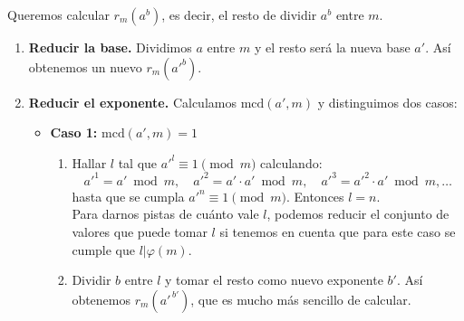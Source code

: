 \documentclass[a4paper,12pt]{article}
\begin{document}
\begin{procedimiento}[title=Reducción de potencias]
Queremos calcular \(r_m(a^b)\), es decir, el resto de dividir \(a^b\) entre \(m\).

\begin{enumerate}
  \item \textbf{Reducir la base.}  
  Dividimos \(a\) entre \(m\) y el resto será la nueva base \(a'\).  
  Así obtenemos un nuevo \(r_m(a'^b)\).

  \item \textbf{Reducir el exponente.}  
  Calculamos \(\text{mcd}(a',m)\) y distinguimos dos casos:

  \begin{itemize}
    \item \textbf{Caso 1:} \(\text{mcd}(a',m)=1\)
    \begin{enumerate}
      \item[1.1)] Hallar \(l\) tal que \(a'^l \equiv 1 \pmod{m}\) calculando:
      \[
      a'^1 = a' \bmod m, \quad a'^2 = a'\cdot a' \bmod m, \quad a'^3 = a'^2 \cdot a' \bmod m, \ldots
      \]
      hasta que se cumpla \(a'^n \equiv 1 \pmod{m}\). Entonces \(l = n\). \\
      Para darnos pistas de cuánto vale $l$, podemos reducir el conjunto de valores que puede tomar $l$ si tenemos en cuenta que para este caso se cumple que $l|\varphi(m)$.
      \item[1.2)] Dividir \(b\) entre \(l\) y tomar el resto como nuevo exponente \(b'\).  
      Así obtenemos \(r_m(a'^{\,b'})\), que es mucho más sencillo de calcular.
    \end{enumerate}


\end{itemize}
\end{enumerate}
\end{procedimiento}
\end{document}
